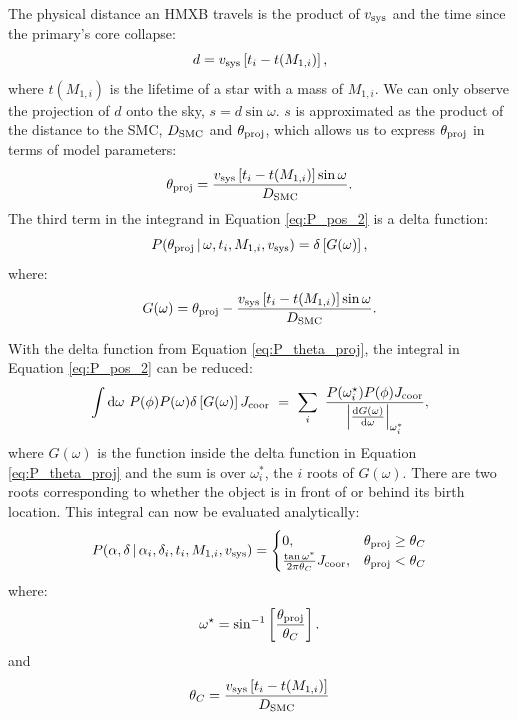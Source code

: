 \documentclass[12pt, preprint]{aastex}
\newcommand{\given}{\,|\,}
\newcommand{\dd}{\mathrm{d}}
\begin{document}
The physical distance an HMXB travels is the product of $v_{\rm sys}$ and the time since the primary's core collapse:
\begin{equation}
d = v_{\rm sys} \left[t_i - t(M_{1,i}) \right],
\end{equation}
where $t(M_{1,i})$ is the lifetime of a star with a mass of $M_{1,i}$. We can only observe the projection of $d$ onto the sky, $s = d \sin \omega$. $s$ is approximated as the product of the distance to the SMC, $D_{\rm SMC}$ and $\theta_{\rm proj}$, which allows us to express $\theta_{\rm proj}$ in terms of model parameters:
\begin{equation}
\theta_{\rm proj} = \frac{v_{\rm sys} \left[ t_i - t(M_{1,i}) \right] \sin \omega}{D_{\rm SMC}}. \label{eq:theta_proj}
\end{equation}
The third term in the integrand in Equation \ref{eq:P_pos_2} is a delta function:
\begin{equation}
P(\theta_{\rm proj} \given \omega, t_i, M_{1,i}, v_{\rm sys}) = \delta \left[G(\omega)\right], \label{eq:P_theta_proj}
\end{equation}
where:
\begin{equation}
G(\omega) = \theta_{\rm proj} - \frac{v_{\rm sys} \left[t_i - t(M_{1,i}) \right] \sin \omega}{D_{\rm SMC}}.\end{equation}


With the delta function from Equation \ref{eq:P_theta_proj}, the integral in Equation \ref{eq:P_pos_2} can be reduced:
\begin{equation}
\int \dd \omega\ P(\phi) P(\omega) \delta \left[ G(\omega) \right]  J_{\rm coor}\  =\ \sum_i\ \frac{P(\omega_i^{\star}) P(\phi)  J_{\rm coor}}{ \left| \frac{ \dd G (\omega) }{\dd \omega} \right|_{\omega_i^*}},
\end{equation}
where $G(\omega)$ is the function inside the delta function in Equation \ref{eq:P_theta_proj} and the sum is over $\omega_i^*$, the $i$ roots of $G(\omega)$. There are two roots corresponding to whether the object is in front of or behind its birth location. This integral can now be evaluated analytically:
\begin{equation}
P(\alpha, \delta \given \alpha_i, \delta_i, t_i, M_{1,i}, v_{\rm sys} ) =
\begin{cases} 
      0, & \theta_{\rm proj} \geq \theta_C\\
     \frac{\tan \omega^*}{2 \pi \theta_C}  J_{\rm coor}, & \theta_{\rm proj} < \theta_C 
   \end{cases}
\end{equation}
where:
\begin{equation}
\omega^{\star} = \sin^{-1} \left[ \frac{\theta_{\rm proj}}{\theta_C} \right].
\end{equation}
and
\begin{equation}
\theta_C = \frac{v_{\rm sys} \left[ t_i - t(M_{1,i}) \right]}{D_{\rm SMC}} \label{eq:theta_c}
\end{equation}
\end{document}
